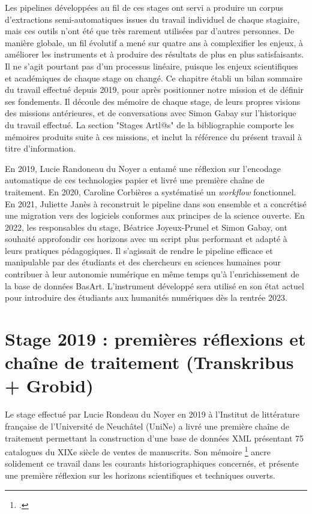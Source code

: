\documentclass[a4paper,12pt,twoside]{book}
\begin{document}
Les pipelines développées au fil de ces stages ont servi a produire un corpus d'extractions semi-automatiques issues du travail individuel de chaque stagiaire, mais ces outils n'ont été que très rarement utilisées par d'autres personnes. De manière globale, un fil évolutif a mené sur quatre ans à complexifier les enjeux, à améliorer les instruments et à produire des résultats de plus en plus satisfaisants. Il ne s'agit pourtant pas d'un processus linéaire, puisque les enjeux scientifiques et académiques de chaque stage on changé. Ce chapitre établi un bilan sommaire du travail effectué depuis 2019, pour après positionner notre mission et de définir ses fondements. Il découle des mémoire de chaque stage, de leurs propres visions des missions antérieures, et de conversations avec Simon Gabay sur l'historique du travail effectué. La section "Stages Artl@s" de la bibliographie comporte les mémoires produits suite à ces missions, et inclut la référence du présent travail à titre d'information.

En 2019, Lucie Randoneau du Noyer a entamé une réflexion sur l'encodage automatique de ces technologies papier et livré une première chaîne de traitement. En 2020, Caroline Corbières a systématisé un \textit{workflow} fonctionnel. En 2021, Juliette Janès à reconstruit le pipeline dans son ensemble et a concrétisé une migration vers des logiciels conformes aux principes de la science ouverte. En 2022, les responsables du stage, Béatrice Joyeux-Prunel et Simon Gabay, ont souhaité approfondir ces horizons avec un script plus performant et adapté à leurs pratiques pédagogiques. Il s'agissait de rendre le pipeline efficace et manipulable par des étudiants et des chercheurs en sciences humaines pour contribuer à leur autonomie numérique en même temps qu'à l'enrichissement de la base de données BasArt. L'instrument développé sera utilisé en son état actuel pour introduire des étudiants aux humanités numériques dès la rentrée 2023. 


\section{Stage 2019 : premières réflexions et chaîne de traitement (Transkribus + Grobid)}

Le stage effectué par Lucie Rondeau du Noyer en 2019 à l’Institut de littérature française de l’Université de Neuchâtel (UniNe) a livré une première chaîne de traitement permettant la construction d'une base de données XML présentant 75 catalogues du XIXe siècle de ventes de manuscrits. Son mémoire \footcite{rondeau_du_noyer_encoder_2019} ancre solidement ce travail dans les courants historiographiques concernés, et présente une première réflexion sur les horizons scientifiques et techniques ouverts. 
\end{document}
